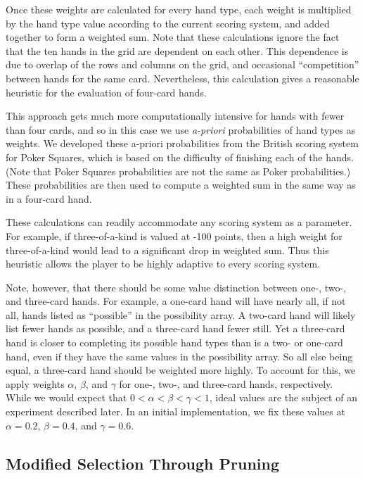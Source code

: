 \documentclass[letterpaper]{article}
\begin{document}
Once these weights are calculated for every hand type, each weight is multiplied by the hand type value according to the current scoring system, and added together to form a weighted sum. Note that these calculations ignore the fact that the ten hands in the grid are dependent on each other. This dependence is due to overlap of the rows and columns on the grid, and occasional ``competition'' between hands for the same card. Nevertheless, this calculation gives a reasonable heuristic for the evaluation of four-card hands.

This approach gets much more computationally intensive for hands with fewer than four cards, and so in this case we use {\it a-priori} probabilities of hand types as weights. We developed these a-priori probabilities from the British scoring system for Poker Squares, which is based on the difficulty of finishing each of the hands. (Note that Poker Squares probabilities are not the same as Poker probabilities.) These probabilities are then used to compute a weighted sum in the same way as in a four-card hand.

These calculations can readily accommodate any scoring system as a parameter. For example, if three-of-a-kind is valued at -100 points, then a high weight for three-of-a-kind would lead to a significant drop in weighted sum. Thus this heuristic allows the player to be highly adaptive to every scoring system.

Note, however, that there should be some value distinction between one-, two-, and three-card hands. For example, a one-card hand will have nearly all, if not all, hands listed as ``possible'' in the possibility array. A two-card hand will likely list fewer hands as possible, and a three-card hand fewer still. Yet a three-card hand is closer to completing its possible hand types than is a two- or one-card hand, even if they have the same values in the possibility array. So all else being equal, a three-card hand should be weighted more highly. To account for this, we apply weights $\alpha$, $\beta$, and $\gamma$ for one-, two-, and three-card hands, respectively. While we would expect that $0 < \alpha < \beta < \gamma < 1$, ideal values are the subject of an experiment described later. In an initial implementation, we fix these values at $\alpha = 0.2$, $\beta = 0.4$, and $\gamma = 0.6$.

\subsection{Modified Selection Through Pruning}
\end{document}
